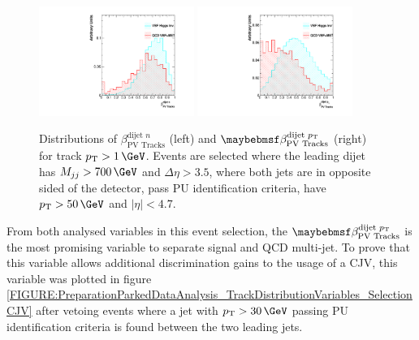 \begin{figure}[!htb]
\centering
\includegraphics[width=0.45\textwidth]{Chapter06/TrackVariables/Images/Tracks1_TracksNRatio.pdf} 
\includegraphics[width=0.45\textwidth]{Chapter06/TrackVariables/Images/Tracks1_TracksERatio.pdf}
\caption[Distributions of $\beta_{\text{PV Tracks}}^{\text{dijet }n}$ and $\beta_{\text{PV Tracks}}^{\text{dijet }\pt}$ for track $\pt>1\,\GeV$]
{Distributions of $\beta_{\text{PV Tracks}}^{\text{dijet }n}$ (left) and $\beta_{\text{PV Tracks}}^{\text{dijet }\pt}$ (right) for track $\pt>1\,\GeV$. Events are selected where the leading dijet has $M_{jj}>700\,\GeV$ and $\Delta\eta>3.5$, where both jets are in opposite sided of the detector, pass \gls{PU} identification criteria, have $\pt>50\,\GeV$ and $|\eta|<4.7$.}
\label{FIGURE:PreparationParkedDataAnalysis_TrackDistributionVariables_Selection}
\end{figure}

From both analysed variables in this event selection, the $\beta_{\text{PV Tracks}}^{\text{dijet }\pt}$ is the most promising variable to separate signal and \gls{QCD} multi-jet. To prove that this variable allows additional discrimination gains to the usage of a \gls{CJV}, this variable was plotted in figure \ref{FIGURE:PreparationParkedDataAnalysis_TrackDistributionVariables_SelectionCJV} after vetoing events where a jet with $\pt>30\,\GeV$ passing \gls{PU} identification criteria is found between the two leading jets.

